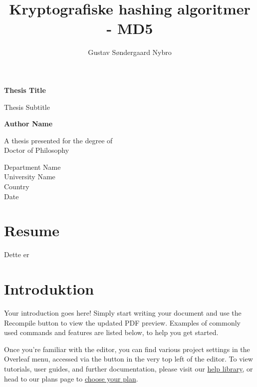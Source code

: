 \documentclass{article}
\title{Kryptografiske hashing algoritmer - MD5}
\author{Gustav Søndergaard Nybro}
\begin{document}
    \begin{titlepage}
        \begin{center}
            \vspace*{1cm}

            \textbf{Thesis Title}

            \vspace{0.5cm}
            Thesis Subtitle

            \vspace{1.5cm}

            \textbf{Author Name}

            \vfill

            A thesis presented for the degree of\\
            Doctor of Philosophy

            \vspace{0.8cm}



            Department Name\\
            University Name\\
            Country\\
            Date

        \end{center}
    \end{titlepage}

    \newpage



    \tableofcontents


    \section{Resume}\label{sec:resume}
    Dette er


    \section{Introduktion}

    Your introduction goes here! Simply start writing your document and use the Recompile button to view the updated PDF preview. Examples of commonly used commands and features are listed below, to help you get started.

    Once you're familiar with the editor, you can find various project settings in the Overleaf menu, accessed via the button in the very top left of the editor. To view tutorials, user guides, and further documentation, please visit our \href{https://www.overleaf.com/learn}{help library}, or head to our plans page to \href{https://www.overleaf.com/user/subscription/plans}{choose your plan}.
\end{document}
